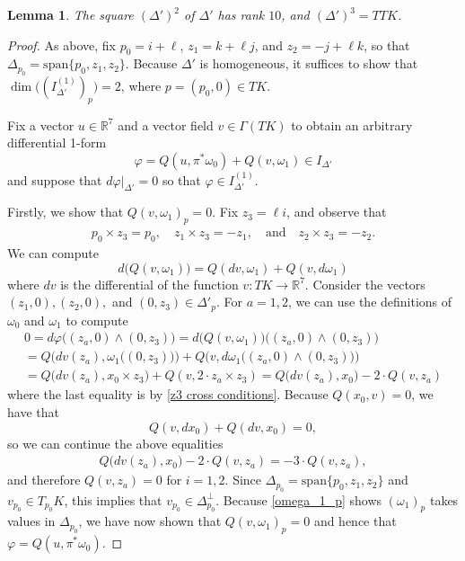 \documentclass[11pt,letterpaper]{amsart}
\newtheorem{lemma}[theorem]{Lemma}
\numberwithin{equation}{section}
\begin{document}
\begin{lemma}
    \label{lemma: Delta' growth}
    The square $(\Delta')^2$ of $\Delta'$ has rank $10$, and $(\Delta')^3 = TTK$.
\end{lemma}
\begin{proof}
    As above, fix $p_0 = i + \ell$, $z_1 = k+\ell j$, and $z_2 = -j +\ell k$, so that $\Delta_{p_0} = \mathrm{span}\{p_0,z_1,z_2\}$. Because $\Delta'$ is homogeneous, it suffices to show that $\dim\big((I_{\Delta'}^{(1)})_{p}\big) = 2$, where $p= (p_0,0)\in TK$. 
    
    Fix a vector $u\in \mathbb{R}^7$ and a vector field $v\in \Gamma(TK)$ to obtain an arbitrary differential 1-form
    \begin{equation}
        \label{def varphi}
        \varphi =Q(u,\pi^*\omega_0) +  Q(v, \omega_1) \in I_{\Delta'}
    \end{equation}
    and suppose that $d\varphi|_{\Delta'}=0$ so that $\varphi\in I_{\Delta'}^{(1)}$. 

    Firstly, we show that $Q(v,\omega_1)_{p} = 0$. Fix $z_3 = \ell i$, and observe that 
    \begin{gather}
        \label{z3 cross conditions}
        p_0\times z_3 = p_0, \quad z_1\times z_3 = -z_1,\quad \text{and}\quad z_2\times z_3 = -z_2.
    \end{gather}
    We can compute
    \begin{equation}
        \label{dN}
        d\big(Q(v,\omega_1)\big) = Q(dv,\omega_1) + Q(v,d\omega_1)
    \end{equation}
    where $dv$ is the differential of the function $v:TK\to \mathbb{R}^7$. Consider the vectors $(z_1,0),(z_2,0),$ and $(0,z_3)\in \Delta'_p$. For $a=1,2$, we can use the definitions of $\omega_0$ and $\omega_1$ to compute
    \begin{gather}
        0=d\varphi\big((z_a,0)\wedge(0,z_3)\big) = d\big(Q(v,\omega_1)\big)\big((z_a,0)\wedge(0,z_3)\big) 
        \\
        = Q\Big(dv(z_a), \omega_1\big((0,z_3)\big)\Big) + Q\Big(v,d\omega_1\big((z_a,0)\wedge (0,z_3)\big)\Big)
        \\
        = Q\big(dv(z_a),x_0\times z_3\big) + Q(v, 2\cdot z_a\times z_3)
        = Q\big(dv(z_a),x_0\big) - 2\cdot Q(v, z_a)
    \end{gather}
    where the last equality is by \eqref{z3 cross conditions}. Because $Q(x_0,v)=0$, we have that
    \begin{equation}
    \label{dv cond}
        Q(v,dx_0) + Q(dv,x_0)=0,
    \end{equation} so we can continue the above equalities
    \begin{gather}
        Q\big(dv(z_a),x_0\big) - 2\cdot Q(v, z_a) = - 3\cdot Q(v,z_a),
    \end{gather}
    and therefore $Q(v,z_a) = 0$ for $i=1,2$. Since $\Delta_{p_0} = \mathrm{span}\{p_0,z_1,z_2\}$ and $v_{p_0}\in T_{p_0}K$, this implies that $v_{p_0}\in \Delta^\perp_{p_0}$. Because \eqref{omega_1_p} shows $(\omega_1)_p$ takes values in $\Delta_{p_0}$, we have now shown that $Q(v,\omega_1)_{p}=0$ and hence that $\varphi = Q(u,\pi^*\omega_0)$.


\end{proof}
\end{document}
